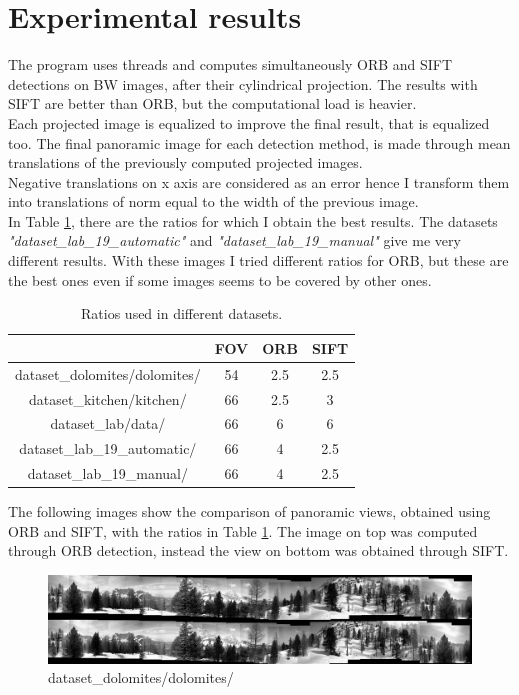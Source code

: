 \documentclass{article}
\begin{document}
\section{Experimental results}
The program uses threads and computes simultaneously ORB and SIFT detections on BW images, after their cylindrical projection. The results with SIFT are better than ORB, but the computational load is heavier.\\
Each projected image is equalized to improve the final result, that is equalized too. The final panoramic image for each detection method, is made through mean translations of the previously computed projected images.\\
Negative translations on x axis are considered as an error hence I transform them into translations of norm equal to the width of the previous image.\\
In Table \ref{ratios}, there are the ratios for which I obtain the best results. The datasets \textit{"dataset\_lab\_19\_automatic"} and \textit{"dataset\_lab\_19\_manual"} give me very different results. With these images I tried different ratios for ORB, but these are the best ones even if some images seems to be covered by other ones. 
\begin{table}[H]
\centering
\begin{tabular}{|c|c|c|c|}
\cline{2-4}
\multicolumn{1}{c|}{}&{\textbf{FOV}}&{\textbf{ORB}}&{\textbf{SIFT}}\\
\hline
{dataset\_dolomites/dolomites/}&{54}&{2.5}&{2.5}\\
\hline
{dataset\_kitchen/kitchen/}&{66}&{2.5}&{3}\\
\hline
{dataset\_lab/data/}&{66}&{6}&{6}\\
\hline
{dataset\_lab\_19\_automatic/}&{66}&{4}&{2.5}\\
\hline
{dataset\_lab\_19\_manual/}&{66}&{4}&{2.5}\\
\hline
\end{tabular}
\renewcommand{\arraystretch}{1}
\caption{Ratios used in different datasets.}\label{ratios}
\end{table}
The following images show the comparison of panoramic views, obtained using ORB and SIFT, with the ratios in Table \ref{ratios}. The image on top was computed through ORB detection, instead the view on bottom was obtained through SIFT.
\begin{figure}[h]
\begin{center}
\includegraphics[width=170mm]{output1} 
\caption{\footnotesize{dataset\_dolomites/dolomites/}}
\end{center} 
\end{figure}
\end{document}
